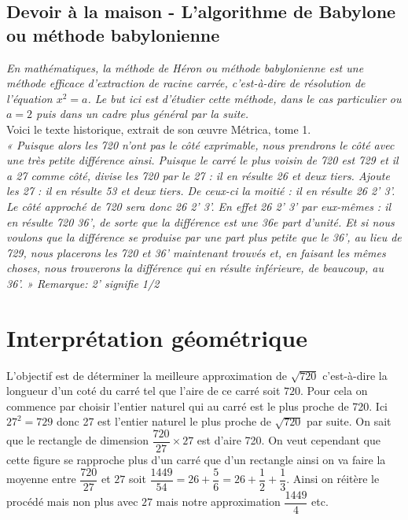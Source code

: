 \documentclass[french]{article}
\begin{document}
\begin{center}
\section*{Devoir à la maison - L'algorithme de Babylone ou méthode babylonienne}
\end{center}
 
\textit{En mathématiques, la méthode de Héron ou méthode babylonienne est une méthode efficace d'extraction de racine carrée, c’est-à-dire de résolution de l'équation $x^2 = a$. Le but ici est d'étudier cette méthode, dans le cas particulier ou $a=2$ puis dans un cadre plus général par la suite.}\\

Voici le texte historique, extrait de son œuvre Métrica, tome 1. \\


\textit{« Puisque alors les 720 n'ont pas le côté exprimable, nous prendrons le côté avec une très petite différence ainsi. Puisque le carré le plus voisin de 720 est 729 et il a 27 comme côté, divise les 720 par le 27 : il en résulte 26 et deux tiers. Ajoute les 27 : il en résulte 53 et deux tiers. De ceux-ci la moitié : il en résulte 26 2' 3'. Le côté approché de 720 sera donc 26 2' 3'. En effet 26 2' 3' par eux-mêmes : il en résulte 720 36', de sorte que la différence est une 36e part d'unité. Et si nous voulons que la différence se produise par une part plus petite que le 36', au lieu de 729, nous placerons les 720 et 36' maintenant trouvés et, en faisant les mêmes choses, nous trouverons la différence qui en résulte inférieure, de beaucoup, au 36'. » Remarque: 2’ signifie 1/2} \\


\section*{Interprétation géométrique}
L'objectif est de déterminer la meilleure approximation de $\sqrt{720}$ c'est-à-dire la longueur d'un coté du carré
tel que l'aire de ce carré soit $720$. Pour cela on commence par choisir l'entier naturel qui au carré est le plus proche de 720. Ici $27^2=729$ donc 27 est l'entier naturel le plus proche de $\sqrt{720}$ par suite. On sait que le rectangle de dimension $\dfrac{720}{27} \times 27$ est d'aire 720. On veut cependant que cette figure se rapproche plus d'un carré que d'un rectangle ainsi on va faire la moyenne entre $\dfrac{720}{27}$ et $27$ soit $\dfrac{1449}{54}=26+\dfrac{5}{6}=26+ \dfrac{1}{2}+ \dfrac{1}{3} $. Ainsi on réitère le procédé mais non plus avec $27$ mais notre approximation $\dfrac{1449}{4}$ etc. 
\end{document}
